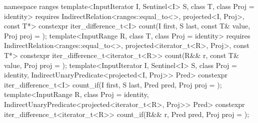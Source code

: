 \begin{codeblock}
{  namespace ranges {
    template<InputIterator I, Sentinel<I> S, class T, class Proj = identity>
      requires IndirectRelation<ranges::equal_to<>, projected<I, Proj>, const T*>
      constexpr iter_difference_t<I>
        count(I first, S last, const T& value, Proj proj = {});
    template<InputRange R, class T, class Proj = identity>
      requires IndirectRelation<ranges::equal_to<>, projected<iterator_t<R>, Proj>, const T*>
      constexpr iter_difference_t<iterator_t<R>>
        count(R&& r, const T& value, Proj proj = {});
    template<InputIterator I, Sentinel<I> S, class Proj = identity,
             IndirectUnaryPredicate<projected<I, Proj>> Pred>
      constexpr iter_difference_t<I>
        count_if(I first, S last, Pred pred, Proj proj = {});
    template<InputRange R, class Proj = identity,
             IndirectUnaryPredicate<projected<iterator_t<R>, Proj>> Pred>
      constexpr iter_difference_t<iterator_t<R>>
        count_if(R&& r, Pred pred, Proj proj = {});
  }

}
\end{codeblock}
